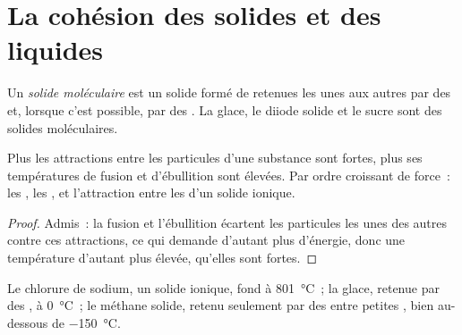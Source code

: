 \section{La cohésion des solides et des liquides}

\begin{definition}\label{def:g11:polarity-and-cohesion:molecular-solid}
Un \emph{solide moléculaire} est un solide
formé de  retenues les unes aux autres par des  et, lorsque c'est possible, par des . La
glace, le diiode solide et le sucre sont des solides moléculaires.
\end{definition}

\begin{proposition}\label{prop:g11:polarity-and-cohesion:cohesion}
Plus les attractions entre les particules d'une substance sont fortes,
plus ses températures de fusion et d'ébullition sont élevées. Par ordre
croissant de force~: les , les , et l'attraction entre les  d'un solide ionique.
\end{proposition}

\begin{proof}
Admis~: la fusion et l'ébullition écartent les particules les unes des
autres contre ces attractions, ce qui demande d'autant plus d'énergie,
donc une température d'autant plus élevée, qu'elles sont fortes.
\end{proof}

\begin{example}\label{ex:g11:polarity-and-cohesion:three}
Le chlorure de sodium, un solide ionique, fond à \qty{801}{\celsius}~; la
glace, retenue par des , à \qty{0}{\celsius}~; le
méthane solide, retenu seulement par des 
entre petites , bien au-dessous de \qty{-150}{\celsius}.
\end{example}

